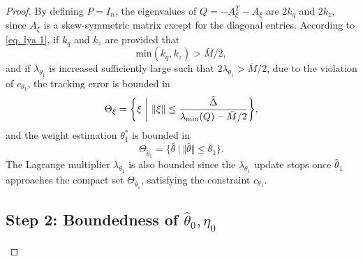 \documentclass[letterpaper, 10 pt, conference]{ieeeconf}  %
\begin{document}
\begin{proof}
By defining $P=I_n$, the eigenvalues of $Q=-A_\xi^T-A_\xi$ are $2k_q$ and $2k_z$, since $A_\xi$ is a skew-symmetric matrix except for the diagonal entries.
According to \eqref{eq. lya 1}, if $k_q$ and $k_z$ are provided that
\begin{equation}
    \text{min}(k_q,k_z)>\bar M/2
    ,
    \label{eq. ctrl stable condition}
\end{equation}
and if $\lambda_{\theta_1}$ is increased sufficiently large such that $2\lambda_{\theta_1}>\bar M/2$, due to the violation of $c_{\theta_1}$, the tracking error is bounded in
\begin{equation*}
    \Theta_\xi = 
    \bigg\{
        \xi \ \bigg\vert\ \Vert\xi\Vert \le  
        {
            \bar \Delta \over \lambda _\text{min}(Q)-\bar M/2
        } 
    \bigg\}
    ,
\end{equation*}
and the weight estimation $\theta^*_1$ is bounded in
\begin{equation*}
    \Theta_{\hat\theta_1} = 
    \{ 
        \hat\theta 
        \ 
        \vert
        \ 
        \Vert\hat\theta\Vert \le  
        \bar\theta_1
    \}
    .
\end{equation*}
The Lagrange multiplier $\lambda_{\theta_1}$ is also bounded since the $\lambda_{\theta_1}$ update stops once $\hat\theta_1$ approaches the compact set $\Theta_{\hat\theta_1}$, satisfying the constraint $c_{\theta_1}$.

\subsection*{Step 2: Boundedness of $\hat\theta_0,\eta_0$}


\end{proof}
\end{document}
